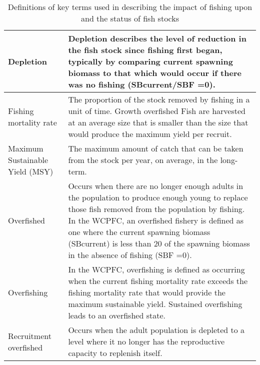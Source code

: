 \begin{table}[h]
\caption{Definitions of key terms used in describing the impact of fishing upon and the status of fish stocks}
\begin{tabular}{ | p{5cm} | p{10cm} |}
\hline
Depletion & Depletion describes the level of reduction in the fish stock since fishing
first began, typically by comparing current spawning biomass to that
which would occur if there was no fishing (SBcurrent/SBF =0). \\ \hline
Fishing mortality rate & The proportion of the stock removed by fishing in a unit of time.
Growth overfished Fish are harvested at an average size that is smaller than the size that
would produce the maximum yield per recruit. \\ \hline
Maximum Sustainable Yield (MSY) & The maximum amount of catch that can be taken from the stock per
year, on average, in the long-term. \\ \hline
Overfished & Occurs when there are no longer enough adults in the population to
produce enough young to replace those fish removed from the population
by fishing. In the WCPFC, an overfished fishery is defined as one
where the current spawning biomass (SBcurrent) is less than 20 of the
spawning biomass in the absence of fishing (SBF =0). \\ \hline
Overfishing & In the WCPFC, overfishing is defined as occurring when the current
fishing mortality rate exceeds the fishing mortality rate that would
provide the maximum sustainable yield. Sustained overfishing leads to
an overfished state. \\ \hline
Recruitment overfished & Occurs when the adult population is depleted to a level where it no longer has the reproductive capacity to replenish itself. \\
\hline
\end{tabular}
\label{expl_table}
\end{table}